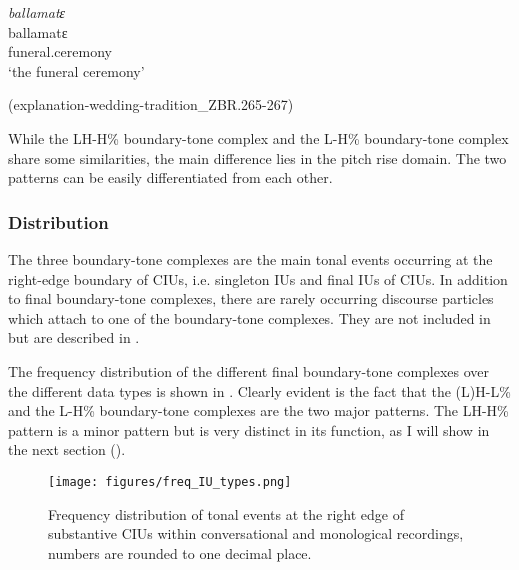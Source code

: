 \ea
\label{ex:cremonies}



{
	\ex
	\label{ex:ballamate}
	\textit{ballamatɛ} \\
	\gll  ballamatɛ \\
	funeral.ceremony \\
	\glt `the funeral ceremony'
	\begin{flushright}(explanation-wedding-tradition\_ZBR.265-267)
		\end{flushright}
}
\z
\z




While the LH-H\% boundary-tone complex and the L-H\% boundary-tone complex share some similarities, the main difference lies in the pitch rise domain.  The two patterns can be easily differentiated from each other.


\subsubsection{Distribution}

The three boundary-tone complexes are the main tonal events occurring at the right-edge boundary of CIUs, i.e. singleton IUs and final IUs of CIUs. In addition to final boundary-tone complexes, there are rarely occurring discourse particles which attach to one of the boundary-tone complexes. They are not included in  	 but are described in   . 


The frequency distribution of the different final boundary-tone complexes over the different data types is shown in  . Clearly evident is the fact that the (L)H-L\% and the L-H\% boundary-tone complexes are the two major patterns. The LH-H\% pattern is a minor pattern but is very distinct in its function, as I will show in the next section (). 

\begin{figure}
	\texttt{[image: figures/freq\_IU\_types.png]}
	\caption{Frequency distribution of tonal events at the right edge of substantive CIUs within conversational and monological recordings, numbers are rounded to  one decimal place.}
	\label{Freq_IU_type}
\end{figure}




